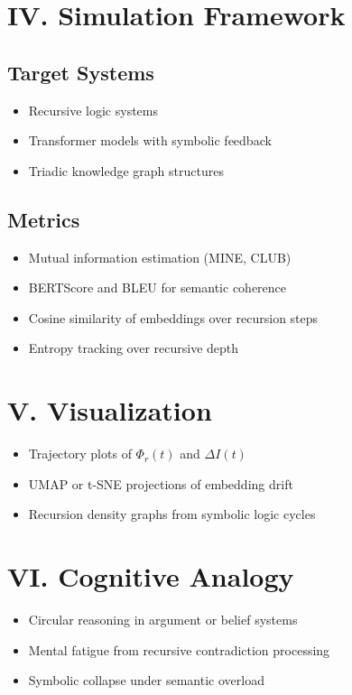 \documentclass[12pt]{article}
\begin{document}
\section*{IV. Simulation Framework}

\subsection*{Target Systems}

\begin{itemize}
  \item Recursive logic systems
  \item Transformer models with symbolic feedback
  \item Triadic knowledge graph structures
\end{itemize}

\subsection*{Metrics}

\begin{itemize}
  \item Mutual information estimation (MINE, CLUB)
  \item BERTScore and BLEU for semantic coherence
  \item Cosine similarity of embeddings over recursion steps
  \item Entropy tracking over recursive depth
\end{itemize}

\section*{V. Visualization}

\begin{itemize}
  \item Trajectory plots of $\Phi_r(t)$ and $\Delta I(t)$
  \item UMAP or t-SNE projections of embedding drift
  \item Recursion density graphs from symbolic logic cycles
\end{itemize}

\section*{VI. Cognitive Analogy}

\begin{itemize}
  \item Circular reasoning in argument or belief systems
  \item Mental fatigue from recursive contradiction processing
  \item Symbolic collapse under semantic overload
\end{itemize}
\end{document}
